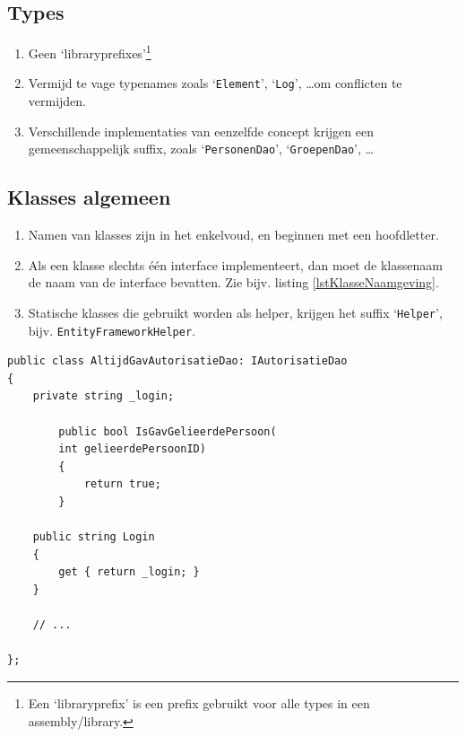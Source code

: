 \documentclass[a4paper,11pt]{article}
\begin{document}
\subsection{Types}

\begin{enumerate}[resume]
\item Geen `libraryprefixes'\footnote{Een `libraryprefix' is een prefix
gebruikt voor alle types in een assembly/library.}
\item Vermijd te vage typenames zoals `\lstinline !Element!',
`\lstinline !Log!', \ldots om conflicten te vermijden.
\item Verschillende implementaties van eenzelfde concept krijgen een
gemeenschappelijk suffix, zoals `\lstinline !PersonenDao!', `\lstinline !GroepenDao!', \ldots
\end{enumerate}

\subsection{Klasses algemeen}

\begin{enumerate}[resume]
\item Namen van klasses zijn in het enkelvoud, en beginnen met een hoofdletter.
\item Als een klasse slechts \'e\'en interface implementeert, dan moet de
klassenaam de naam van de interface bevatten.  Zie bijv. listing \ref{lstKlasseNaamgeving}.
\item Statische klasses die gebruikt worden als helper, krijgen het suffix
`\lstinline !Helper!', bijv. \lstinline !EntityFrameworkHelper!.
\end{enumerate}


\begin{lstlisting}[float,caption=Naamgeving klasses,label=lstKlasseNaamgeving]
public class AltijdGavAutorisatieDao: IAutorisatieDao
{
	private string _login;

        public bool IsGavGelieerdePersoon(
		int gelieerdePersoonID)
        {
            return true;
        }

	public string Login
	{
		get { return _login; }
	}

	// ...

};
\end{lstlisting}
\end{document}
